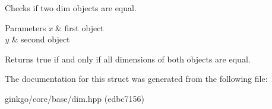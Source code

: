 Checks if two dim objects are equal. 


\begin{DoxyParams}{Parameters}
{\em x} & first object \\
\hline
{\em y} & second object\\
\hline
\end{DoxyParams}
\begin{DoxyReturn}{Returns}
true if and only if all dimensions of both objects are equal. 
\end{DoxyReturn}


The documentation for this struct was generated from the following file\+:\begin{DoxyCompactItemize}
\item 
ginkgo/core/base/dim.\+hpp (edbc7156)\end{DoxyCompactItemize}
